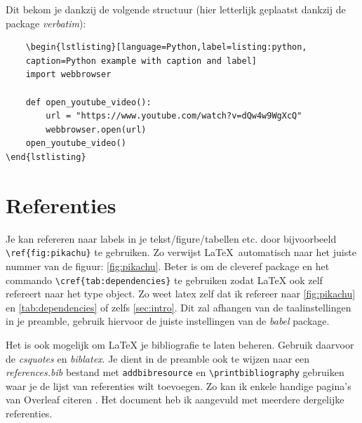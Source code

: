\documentclass{article}
\begin{document}
Dit bekom je dankzij de volgende structuur (hier letterlijk geplaatst dankzij de package \textit{verbatim}):
\begin{verbatim}
    \begin{lstlisting}[language=Python,label=listing:python,
    caption=Python example with caption and label]    
    import webbrowser
    
    def open_youtube_video():
        url = "https://www.youtube.com/watch?v=dQw4w9WgXcQ"
        webbrowser.open(url)
    open_youtube_video()
\end{lstlisting}
\end{verbatim}

\section{Referenties}
Je kan refereren naar labels in je tekst/figure/tabellen etc. door bijvoorbeeld \verb|\ref{fig:pikachu}| te gebruiken.
Zo verwijst \LaTeX ~automatisch naar het juiste nummer van de figuur: \ref{fig:pikachu}.
Beter is om de cleveref package en het commando \verb|\cref{tab:dependencies}| te gebruiken zodat LaTeX ook zelf refereert naar het type object.
Zo weet latex zelf dat ik refereer naar \cref{fig:pikachu} en \cref{tab:dependencies} of zelfs \cref{sec:intro}.
Dit zal afhangen van de taalinstellingen in je preamble, gebruik hiervoor de juiste instellingen van de \textit{babel} package.


Het is ook mogelijk om LaTeX je bibliografie te laten beheren.
Gebruik daarvoor de \textit{csquotes} en \textit{biblatex}.
Je dient in de preamble ook te wijzen naar een \textit{references.bib} bestand met \verb|addbibresource| en \verb|\printbibliography| gebruiken waar je de lijst van referenties wilt toevoegen.
Zo kan ik enkele handige pagina's van Overleaf citeren \cite{Overleaf30min}.
Het document heb ik aangevuld met meerdere dergelijke referenties.

\printbibliography
\end{document}
